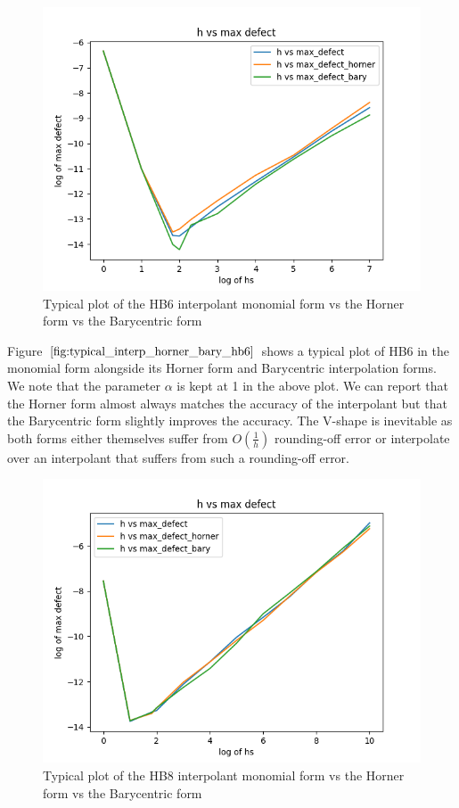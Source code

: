 \documentclass{article}
\begin{document}
\begin{figure}[H]
\centering
\includegraphics[width=0.7\linewidth]{./figures/typical_interp_horner_bary_hb6}
\caption{Typical plot of the HB6 interpolant monomial form vs the Horner form vs the Barycentric form}
\label{fig:typical_interp_horner_bary_hb6}
\end{figure}

Figure $\ref{fig:typical_interp_horner_bary_hb6}$ shows a typical plot of HB6 in the monomial form alongside its Horner form and Barycentric interpolation forms. We note that the parameter $\alpha$ is kept at 1 in the above plot. We can report that the Horner form almost always matches the accuracy of the interpolant but that the Barycentric form slightly improves the accuracy. The V-shape is inevitable as both forms either themselves suffer from $O(\frac{1}{h})$ rounding-off error or interpolate over an interpolant that suffers from such a rounding-off error.

\begin{figure}[H]
\centering
\includegraphics[width=0.7\linewidth]{./figures/typical_interp_horner_bary_hb8}
\caption{Typical plot of the HB8 interpolant monomial form vs the Horner form vs the Barycentric form}
\label{fig:typical_interp_horner_bary_hb8}
\end{figure}
\end{document}
